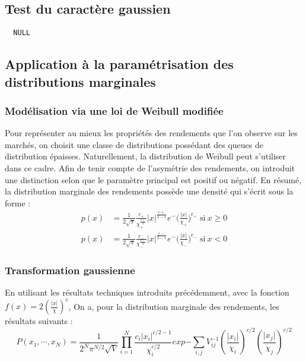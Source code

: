 \documentclass{article}
\begin{document}
  \subsection{Test du caractère gaussien} 
  
  \begin{verbatim}
  NULL
  \end{verbatim}
  
  \subsection{Application à la paramétrisation des distributions marginales}
  
  \subsubsection{Modélisation via une loi de Weibull modifiée}
  
   Pour représenter au mieux les propriétés des rendements que l'on observe sur les marchés, on choisit une classe de distributions possédant des queues de distribution épaisses. Naturellement, la distribution de Weibull peut s'utiliser dans ce cadre. Afin de tenir compte de l'asymétrie des rendements, on introduit une distinction selon que le paramètre principal est positif ou négatif. En résumé, la distribution marginale des rendements possède une densité qui s'écrit sous la forme :
   \begin{align}
   p(x) &= \frac{1}{2\sqrt{\pi}}\frac{c_{+}}{\chi _{+}^{\frac{c+}{2}}}\vert x\vert^{\frac{c+}{2-1}}e^-({\frac{\vert x\vert}{\chi _{+}})^{c_{+}}}\;\text{si}\: x\geqslant 0\\
  p(x) &= \frac{1}{2\sqrt{\pi}}\frac{c_{-}}{\chi _{-}^{\frac{c-}{2}}}\vert x\vert^{\frac{c-}{2-1}}e^-({\frac{\vert x\vert}{\chi _{-}})^{c_{-}}}\;\text{si}\: x<0
  \end{align}
  \subsubsection{Transformation gaussienne}
  En utilisant les résultats techniques introduits précédemment, avec la fonction $ f(x)=2(\frac{\vert x\vert}{\chi})^{c} $, On a, pour la distribution marginale des rendements, les résultats suivants :
  \begin{equation}
  P(x_{1},\cdots ,x_{N})=\frac{1}{2^{N}\pi ^{N/2}\sqrt{V}}\prod ^{N}_{i=1}\frac{c_{i}\vert x_{i}\vert ^{c/2-1}}{\chi _{i}^{c/2}}exp{-\sum _{i,j}V_{ij}^{-1}(\frac{\vert x_{i}\vert}{\chi_{i}})^{c/2}(\frac{\vert x_{j}\vert}{\chi_{j}})^{c/2}}
  \end{equation}
\end{document}
